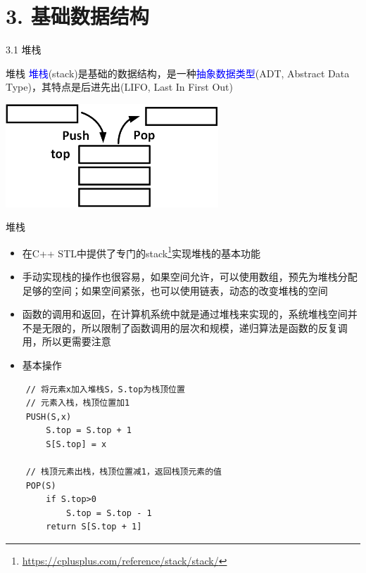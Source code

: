 


\frame{\titlepage}
\section{3. 基础数据结构}
\begin{frame}{3.1 堆栈}
    \begin{block}{堆栈}
        \textcolor{blue}{堆栈}(stack)是基础的数据结构，是一种\textcolor{blue}{抽象数据类型}(ADT, Abstract Data Type)，其特点是后进先出(LIFO, Last In First Out)
    \end{block}
    \vfill
    \includegraphics[width=0.6\textwidth,center]{fig/3-1.png}
\end{frame}
\begin{frame}{堆栈}
    \begin{itemize}
        \item 在C++ STL中提供了专门的stack\footnote{\url{https://cplusplus.com/reference/stack/stack/}}实现堆栈的基本功能
        \vfill
        \item 手动实现栈的操作也很容易，如果空间允许，可以使用数组，预先为堆栈分配足够的空间；如果空间紧张，也可以使用链表，动态的改变堆栈的空间
        \vfill
        \item 函数的调用和返回，在计算机系统中就是通过堆栈来实现的，系统堆栈空间并不是无限的，所以限制了函数调用的层次和规模，递归算法是函数的反复调用，所以更需要注意
    \end{itemize}
\end{frame}
\vspace*{8ex}
\begin{itemize}
    \item[] \Large{基本操作}
\end{itemize}
\begin{lstlisting}
    // 将元素x加入堆栈S，S.top为栈顶位置
    // 元素入栈，栈顶位置加1
    PUSH(S,x) 
        S.top = S.top + 1 
        S[S.top] = x

    // 栈顶元素出栈，栈顶位置减1，返回栈顶元素的值
    POP(S) 
        if S.top>0
            S.top = S.top - 1
        return S[S.top + 1]
\end{lstlisting}
